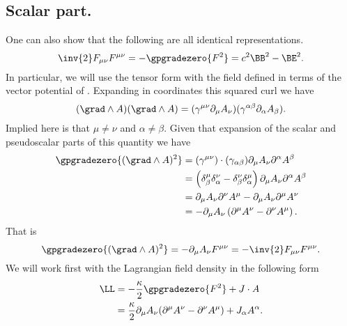 \subsection{Scalar part.}
%
One can also show that the following are all identical representations.
%
\begin{equation}
\inv{2} F_{\mu\nu}F^{\mu\nu} = -\gpgradezero{F^2} = c^2 \BB^2 -\BE^2.
\end{equation}
%
In particular, we will use the tensor form with the field defined in terms of the vector potential of .
Expanding in coordinates this squared curl we have
%
\begin{equation}\label{eqn:lagrangianFieldDensity:100}
(\grad \wedge A) (\grad \wedge A)
= (\gamma^{\mu\nu} \partial_{\mu} A_{\nu})(\gamma^{\alpha\beta} \partial_{\alpha} A_{\beta}) .
\end{equation}
%
Implied here is that \(\mu \ne \nu\) and \(\alpha \ne \beta\).  Given that expansion of the scalar and pseudoscalar parts of this quantity we have
%
\begin{equation}\label{eqn:lagrangianFieldDensity:120}
\begin{aligned}
\gpgradezero{ (\grad \wedge A)^2 }
&= (\gamma^{\mu\nu}) \cdot (\gamma_{\alpha\beta}) \partial_{\mu} A_{\nu} \partial^{\alpha} A^{\beta} \\
&= \left(\delta^{\mu}_{\beta} \delta^{\nu}_{\alpha} - \delta^{\nu}_{\beta} \delta^{\mu}_{\alpha}\right) \partial_{\mu} A_{\nu} \partial^{\alpha} A^{\beta} \\
&= \partial_{\mu} A_{\nu} \partial^{\nu} A^{\mu} -\partial_{\mu} A_{\nu} \partial^{\mu} A^{\nu} \\
&= -\partial_{\mu} A_{\nu} \left( \partial^{\mu} A^{\nu} - \partial^{\nu} A^{\mu} \right) .
\end{aligned}
\end{equation}
%
That is
\begin{equation}
\gpgradezero{ (\grad \wedge A)^2 } = -\partial_{\mu} A_{\nu} F^{\mu\nu} = -\inv{2} F_{\mu\nu}F^{\mu\nu}.
\end{equation}
%
We will work first with the Lagrangian field density in the following form
\begin{equation}\label{eqn:maxFieldLag:density}
\begin{aligned}
\LL &= -\frac{\kappa}{2} \gpgradezero{F^2} + J \cdot A \\
&= \frac{\kappa}{2} \partial_{\mu} A_{\nu} ( \partial^{\mu} A^{\nu} - \partial^{\nu} A^{\mu} ) + J_{\alpha} A^{\alpha}.
\end{aligned}
\end{equation}
%
